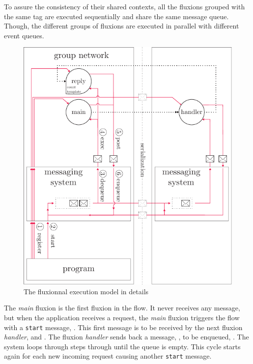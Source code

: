 To assure the consistency of their shared contexts, all the fluxions grouped with the same tag are executed sequentially and share the same message queue.
Though, the different groups of fluxions are executed in parallel with different event queues.

\begin{figure}[h!]
  \includegraphics[width=\linewidth]{ressources/schema-message.pdf}
  \caption{The fluxionnal execution model in details}
  \label{fig:MesSys}
\end{figure}

The \textit{main} fluxion is the first fluxion in the flow.
It never receives any message, but when the application receives a request, the \textit{main} fluxion triggers the flow with a \texttt{start} message, .
This first message is to be received by the next fluxion \textit{handler},  and .
The fluxion \textit{handler} sends back a message, , to be enqueued, .
The system loops through steps  through  until the queue is empty.
This cycle starts again for each new incoming request causing another \texttt{start} message.

